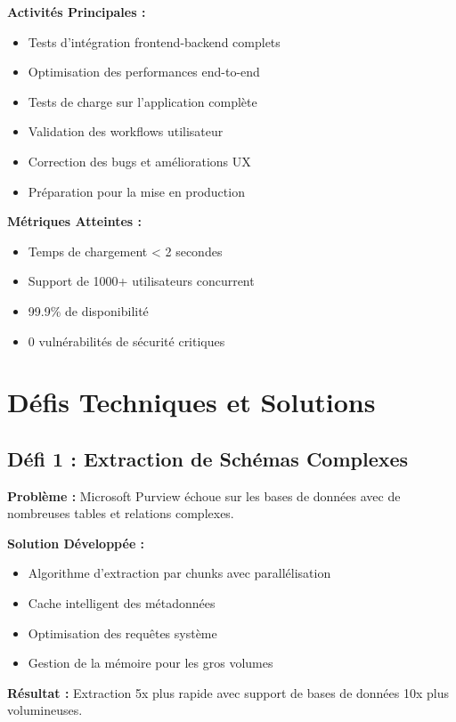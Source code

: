 \documentclass[a4paper,12pt]{article}
\begin{document}
\textbf{Activités Principales :}
\begin{itemize}
    \item Tests d'intégration frontend-backend complets
    \item Optimisation des performances end-to-end
    \item Tests de charge sur l'application complète
    \item Validation des workflows utilisateur
    \item Correction des bugs et améliorations UX
    \item Préparation pour la mise en production
\end{itemize}

\textbf{Métriques Atteintes :}
\begin{itemize}
    \item Temps de chargement < 2 secondes
    \item Support de 1000+ utilisateurs concurrent
    \item 99.9\% de disponibilité
    \item 0 vulnérabilités de sécurité critiques
\end{itemize}

\section*{Défis Techniques et Solutions}

\subsection*{Défi 1 : Extraction de Schémas Complexes}

\textbf{Problème :} Microsoft Purview échoue sur les bases de données avec de nombreuses tables et relations complexes.

\textbf{Solution Développée :}
\begin{itemize}
    \item Algorithme d'extraction par chunks avec parallélisation
    \item Cache intelligent des métadonnées
    \item Optimisation des requêtes système
    \item Gestion de la mémoire pour les gros volumes
\end{itemize}

\textbf{Résultat :} Extraction 5x plus rapide avec support de bases de données 10x plus volumineuses.
\end{document}
